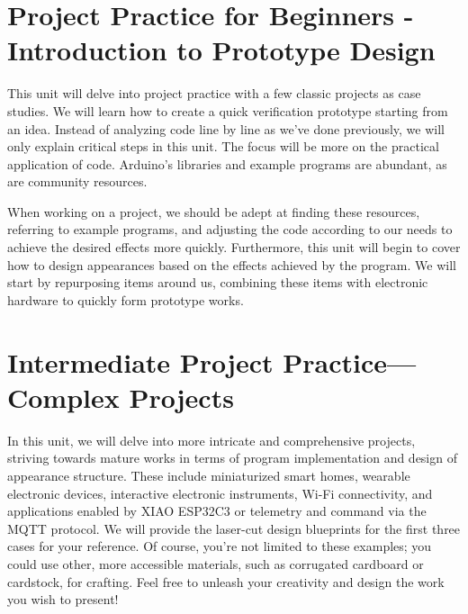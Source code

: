 \documentclass[
  letterpaper,
  DIV=11,
  numbers=noendperiod]{scrreprt}
\begin{document}

\hypertarget{project-practice-for-beginners---introduction-to-prototype-design}{%
\chapter{Project Practice for Beginners - Introduction to Prototype
Design}\label{project-practice-for-beginners---introduction-to-prototype-design}}

This unit will delve into project practice with a few classic projects
as case studies. We will learn how to create a quick verification
prototype starting from an idea. Instead of analyzing code line by line
as we've done previously, we will only explain critical steps in this
unit. The focus will be more on the practical application of code.
Arduino's libraries and example programs are abundant, as are community
resources.

When working on a project, we should be adept at finding these
resources, referring to example programs, and adjusting the code
according to our needs to achieve the desired effects more quickly.
Furthermore, this unit will begin to cover how to design appearances
based on the effects achieved by the program. We will start by
repurposing items around us, combining these items with electronic
hardware to quickly form prototype works.


\hypertarget{intermediate-project-practicecomplex-projects}{%
\chapter{Intermediate Project Practice---Complex
Projects}\label{intermediate-project-practicecomplex-projects}}

In this unit, we will delve into more intricate and comprehensive
projects, striving towards mature works in terms of program
implementation and design of appearance structure. These include
miniaturized smart homes, wearable electronic devices, interactive
electronic instruments, Wi-Fi connectivity, and applications enabled by
XIAO ESP32C3 or telemetry and command via the MQTT protocol. We will
provide the laser-cut design blueprints for the first three cases for
your reference. Of course, you're not limited to these examples; you
could use other, more accessible materials, such as corrugated cardboard
or cardstock, for crafting. Feel free to unleash your creativity and
design the work you wish to present!
\end{document}
